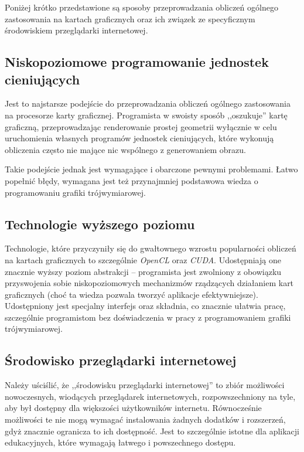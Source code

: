 Poniżej krótko przedstawione są sposoby przeprowadzania obliczeń ogólnego
zastosowania na kartach graficznych oraz ich związek ze specyficznym
środowiskiem przeglądarki internetowej.

\subsection{Niskopoziomowe programowanie jednostek cieniujących}
\label{subsec:niskProgJedn}

Jest to najstarsze podejście do przeprowadzania obliczeń ogólnego zastosowania
na procesorze karty graficznej. Programista w swoisty sposób ,,oszukuje'' kartę
graficzną, przeprowadzając renderowanie prostej geometrii wyłącznie w celu
uruchomienia własnych programów jednostek cieniujących, które wykonują
obliczenia często nie mające nic wspólnego z generowaniem obrazu.

Takie podejście jednak jest wymagające i obarczone pewnymi problemami. Łatwo
popełnić błędy, wymagana jest też przynajmniej podstawowa wiedza o
programowaniu grafiki trójwymiarowej.

\subsection{Technologie wyższego poziomu}
\label{subsec:techWyzPoz}

Technologie, które przyczyniły się do gwałtownego wzrostu popularności obliczeń
na kartach graficznych to szczególnie \emph{OpenCL} oraz \emph{CUDA}.
Udostępniają  one znacznie wyższy poziom abstrakcji -- programista jest
zwolniony z obowiązku przyswojenia sobie niskopoziomowych mechanizmów rządzących
działaniem kart graficznych (choć ta wiedza pozwala tworzyć aplikacje
efektywniejsze). Udostępniony jest specjalny interfejs oraz składnia, co
znacznie ułatwia pracę, szczególnie programistom bez doświadczenia w pracy z
programowaniem grafiki trójwymiarowej.

\subsection{Środowisko przeglądarki internetowej}
\label{subsec:srodPrzegInt}

Należy uściślić, że ,,środowisku przeglądarki internetowej'' to zbiór możliwości
nowoczesnych, wiodących przeglądarek internetowych, rozpowszechniony na tyle,
aby był dostępny dla większości użytkowników internetu. Równocześnie możliwości
te nie mogą wymagać instalowania żadnych dodatków i rozszerzeń, gdyż znacznie
ogranicza to ich dostępność. Jest to szczególnie istotne dla aplikacji
edukacyjnych, które wymagają łatwego i powszechnego dostępu.

